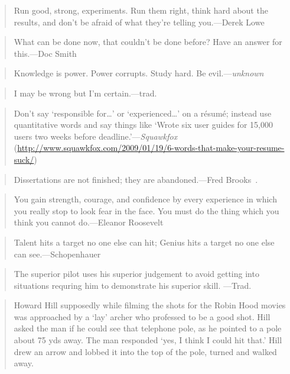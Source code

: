 \documentclass[a4paper]{article}
\begin{document}
\medskip
\begin{quote}
	Run good, strong, experiments. Run them right, think hard
	about the results, and don't be afraid of what they're
	telling you.---Derek Lowe~\citep{Lowe2009a}
\end{quote}

\medskip
\begin{quote}
	What can be done now, that couldn't be done before? Have an
	answer for this.---Doc Smith
\end{quote}

\medskip
\begin{quote}
	Knowledge is power. Power corrupts. Study hard. Be evil.---\emph{unknown}
\end{quote}

\medskip
\begin{quote}
	I may be wrong but I'm certain.---trad.
\end{quote}

\medskip
\begin{quote}
	Don't say `responsible for\ldots' or `experienced\ldots'
	on a r\'{e}sum\'{e}; instead use quantitative words and say things
	like `Wrote six user guides for 15,000 users two weeks before
	deadline.'---\emph{Squawkfox}
	(\url{http://www.squawkfox.com/2009/01/19/6-words-that-make-your-resume-suck/})
\end{quote}

\medskip
\begin{quote}
	Dissertations are not finished; they are
	abandoned.---Fred Brooks~\citep{Azuma2003a}.
\end{quote}

\medskip
\begin{quote}
	You gain strength, courage, and confidence by every experience
	in which you really stop to look fear in the face.  You must do
	the thing which you think you cannot do.---Eleanor Roosevelt
\end{quote}

\medskip
\begin{quote}
	Talent hits a target no one else can hit; Genius hits a target
	no one else can see.---Schopenhauer
\end{quote}

\medskip
\begin{quote}
	The superior pilot uses his superior judgement to avoid getting
	into situations requring him to demonstrate his superior skill.
	---Trad.
\end{quote}

\medskip
\begin{quote}
	Howard Hill supposedly while filming the shots for the Robin Hood
	movies was approached by a `lay' archer who professed to be a good
	shot.  Hill asked the man if he could see that telephone pole, as he
	pointed to a pole about 75 yds away.  The man responded `yes, I think
	I could hit that.'  Hill drew an arrow and lobbed it into the top of
	the pole, turned and walked away.
\end{quote}
\end{document}
